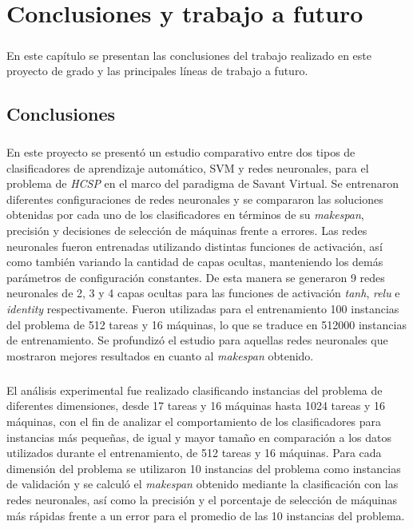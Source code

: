\chapter{Conclusiones y trabajo a futuro} \label{section-conclusiones}

\paragraph{}En este capítulo se presentan las conclusiones del trabajo realizado en este proyecto de grado y las principales líneas de trabajo a futuro.

\section{Conclusiones}

\paragraph{}En este proyecto se presentó un estudio comparativo entre dos tipos de clasificadores de aprendizaje automático, SVM y redes neuronales, para el problema de \textit{HCSP} en el marco del paradigma de Savant Virtual.
Se entrenaron diferentes configuraciones de redes neuronales y se compararon las soluciones obtenidas por cada uno de los clasificadores en términos de su \textit{makespan}, precisión y decisiones de selección de máquinas frente a errores.
Las redes neuronales fueron entrenadas utilizando distintas funciones de activación, así como también variando la cantidad de capas ocultas, manteniendo los demás parámetros de configuración constantes.
De esta manera se generaron 9 redes neuronales de 2, 3 y 4 capas ocultas para las funciones de activación \textit{tanh}, \textit{relu} e \textit{identity} respectivamente.
Fueron utilizadas para el entrenamiento 100 instancias del problema de 512 tareas y 16 máquinas, lo que se traduce en 512000 instancias de entrenamiento.
Se profundizó el estudio para aquellas redes neuronales que mostraron mejores resultados en cuanto al \textit{makespan} obtenido.

\paragraph{}El análisis experimental fue realizado clasificando instancias del problema de diferentes dimensiones, desde 17 tareas y 16 máquinas hasta 1024 tareas y 16 máquinas, con el fin de analizar el comportamiento de los clasificadores para instancias más pequeñas, de igual y mayor tamaño en comparación a los datos utilizados durante el entrenamiento, de 512 tareas y 16 máquinas.
Para cada dimensión del problema se utilizaron 10 instancias del problema como instancias de validación y se calculó el \textit{makespan} obtenido mediante la clasificación con las redes neuronales, así como la precisión y el porcentaje de selección de máquinas más rápidas frente a un error para el promedio de las 10 instancias del problema.

